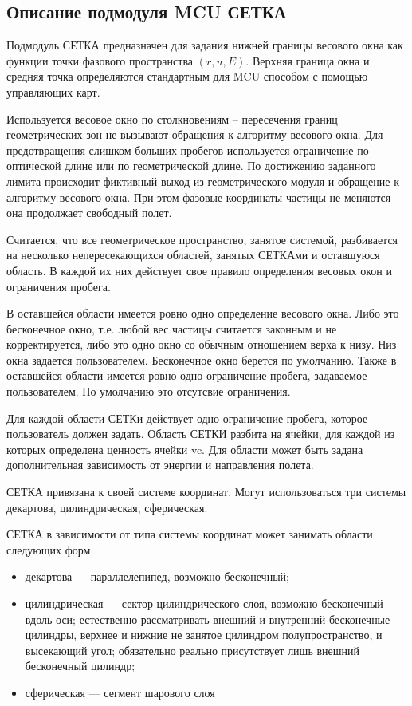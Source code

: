 \documentclass[pdftex,ptm,12pt,a4paper]{report}
\begin{document}
  \subsection{Описание подмодуля MCU СЕТКА}
    Подмодуль СЕТКА предназначен для задания нижней границы весового окна как функции точки фазового пространства $(r,u,E)$.
    Верхняя граница окна и средняя точка определяются стандартным для MCU способом с помощью управляющих карт.

    Используется весовое окно по столкновениям – пересечения границ геометрических зон не вызывают обращения к алгоритму весового окна. Для предотвращения слишком больших пробегов используется ограничение по оптической длине или по геометрической длине. По достижению заданного лимита происходит фиктивный выход из геометрического модуля и обращение к алгоритму весового окна. При этом фазовые координаты частицы не меняются – она продолжает свободный полет.

    Считается, что все геометрическое пространство, занятое системой, разбивается на несколько непересекающихся областей, занятых СЕТКАми и оставшуюся область. В каждой их них действует свое правило определения весовых окон и ограничения пробега.

    В оставшейся области имеется ровно одно определение весового окна. Либо это бесконечное окно, т.е. любой вес частицы считается законным и не корректируется, либо это одно окно со обычным отношением верха к низу. Низ окна задается пользователем. Бесконечное окно берется по умолчанию. Также в оставшейся области имеется ровно одно ограничение пробега, задаваемое пользователем. По умолчанию это отсутсвие ограничения.

    Для каждой области СЕТКи действует одно ограничение пробега, которое пользователь должен задать.
    Область СЕТКИ разбита на ячейки, для каждой из которых определена ценность ячейки vc. Для области может быть задана дополнительная зависимость от энергии и направления полета.

    СЕТКА привязана к своей системе координат. Могут использоваться три системы
      декартова, цилиндрическая, сферическая.

      СЕТКА в зависимости от типа системы координат может занимать области следующих форм:
      \begin{itemize}
        \item декартова --- параллелепипед, возможно бесконечный;
        \item цилиндрическая --- сектор цилиндрического слоя, возможно бесконечный вдоль оси; естественно рассматривать внешний и внутренний бесконечные цилиндры, верхнее и нижние не занятое цилиндром полупространство, и высекающий угол; обязательно реально присутствует лишь внешний бесконечный цилиндр;
        \item сферическая --- сегмент шарового слоя
      \end{itemize}
\end{document}
